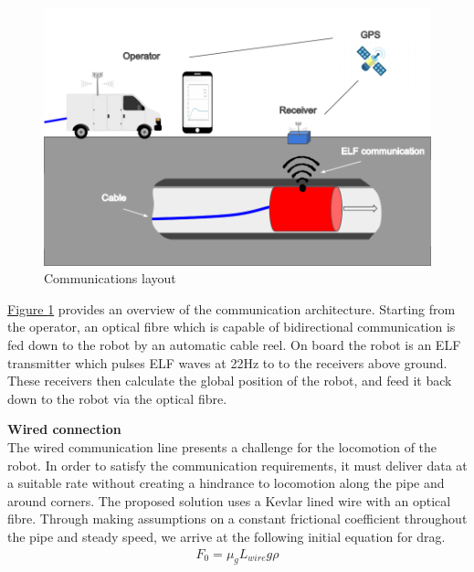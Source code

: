 \documentclass[11pt]{article}		%
\begin{document}
        \begin{figure}[h]
			\centering
			\includegraphics[scale=1]{comms layout.pdf}
			\caption{Communications layout} %
			\label{commsLayout}
		\end{figure}
        
        \hyperref[commsLayout]{Figure \ref*{commsLayout}} provides an overview of the communication architecture. 
        Starting from the operator, an optical fibre which is capable of bidirectional communication is fed down to the robot by an automatic cable reel. 
        On board the robot is an ELF transmitter which pulses ELF waves at 22Hz to to the receivers above ground. 
        These receivers then calculate the global position of the robot, and feed it back down to the robot via the optical fibre.
       
        \textbf{Wired connection}
        \\
        The wired communication line presents a challenge for the locomotion of the robot. 
        In order to satisfy the communication requirements, it must deliver data at a suitable rate without creating a hindrance to locomotion along the pipe and around corners. 
        The proposed solution uses a Kevlar lined wire with an optical fibre. 
        Through making assumptions on a constant frictional coefficient throughout the pipe and steady speed, we arrive at the following initial equation for drag. 
        \begin{align}
				F_0 = \mu_g L_{wire}   g \rho
		\end{align}
        
        
\end{document}
